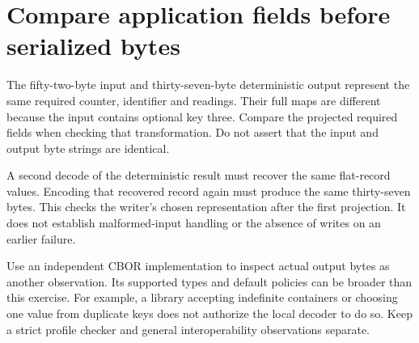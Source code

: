 \section{Compare application fields before serialized bytes}
The fifty-two-byte input and thirty-seven-byte deterministic output represent the same
required counter, identifier and readings. Their full maps are different because the
input contains optional key three. Compare the projected required fields when checking
that transformation. Do not assert that the input and output byte strings are identical.

A second decode of the deterministic result must recover the same flat-record values.
Encoding that recovered record again must produce the same thirty-seven bytes. This
checks the writer's chosen representation after the first projection. It does not
establish malformed-input handling or the absence of writes on an earlier failure.

Use an independent CBOR implementation to inspect actual output bytes as another
observation. Its supported types and default policies can be broader than this
exercise. For example, a library accepting indefinite containers or choosing one value
from duplicate keys does not authorize the local decoder to do so. Keep a strict
profile checker and general interoperability observations separate.
